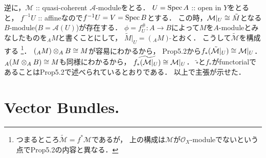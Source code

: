 \documentclass[a4paper]{jsarticle}
\newcommand{\shA}{\mathcal{A}}
\newcommand{\shO}{\mathcal{O}}
\newcommand{\shM}{\mathcal{M}}
\newcommand{\sidetilde}{\,\tilde{}}
\begin{document}
    逆に，$\shM$ :: quasi-coherent $\shA$-moduleをとる．
    $U=\operatorname{Spec} A$ :: open in $Y$をとると，
    $f^{-1}U$ :: affineなので$f^{-1}U=V=\operatorname{Spec} B$とする．
    この時，$\shM|_U \iso \tilde{M}$となる$B$-module($B=\shA(U)$)が存在する．
    $\phi=f^{\#}_U: A \to B$によって$M$を$A$-moduleとみなしたものを${}_A M$と書くことにして，
    $\tilde{M}|_U=({}_A M)\sidetilde$とおく．
    こうして$\tilde{\shM}$を構成する
    \footnote
    {
        つまるところ$\tilde{\shM}=f^* \shM$であるが，
        上の構成は$\shM$が$\shO_X$-moduleでないという点でProp5.2の内容と異なる．
    }．
    $({}_A M) \otimes_A B \cong M$が容易にわかるから，
    Prop5.2から$f_*(\tilde{\shM}|_U) \iso \shM|_U$．
    ${}_A(M \otimes_A B) \cong M$も同様にわかるから，
    $\widetilde{f_*(\shM|_U)} \iso \shM|_U$．
    $\tilde{\square}$と$f_*$がfunctorialであることはProp5.2で述べられているとおりである．
    以上で主張が示せた．

\section{Vector Bundles.} %
\end{document}
